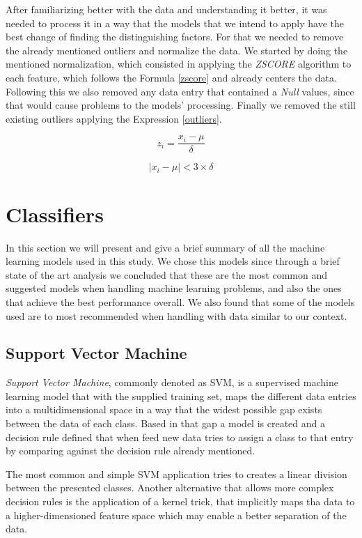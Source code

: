 \documentclass[conference]{IEEEtran}
\begin{document}
After familiarizing better with the data and understanding it better, it was needed to process it in a way that the models that we intend to apply have the best change of finding the distinguishing factors. For that we needed to remove the already mentioned outliers and normalize the data. We started by doing the mentioned normalization, which consisted in applying the \textit{ZSCORE} algorithm to each feature, which follows the Formula \ref{zscore} and already centers the data. Following this we also removed any data entry that contained a \textit{Null} values, since that would cause problems to the models' processing. Finally we removed the still existing outliers applying the Expression \ref{outliers}.

\begin{equation}\label{zscore}
    z_{i} = \frac{x_{i} - \mu}{\delta}
\end{equation}

\begin{equation}\label{outliers}
    |x_{i}-\mu| < 3\times\delta
\end{equation}

\section{Classifiers}\label{classifiers}
In this section we will present and give a brief summary of all the machine learning models used in this study. We chose this models since through a brief state of the art analysis we concluded that these are the most common and suggested models when handling machine learning problems, and also the ones that achieve the best performance overall. We also found that some of the models used are to most recommended when handling with data similar to our context.

\subsection{Support Vector Machine}
\textit{Support Vector Machine}, commonly denoted as SVM, is a supervised machine learning model that with the supplied training set, maps the different data entries into a multidimensional space in a way that the widest possible gap exists between the data of each class. Based in that gap a model is created and a decision rule defined that when feed new data tries to assign a class to that entry by comparing against the decision rule already mentioned.

The most common and simple SVM application tries to creates a linear division between the presented classes. Another alternative that allows more complex decision rules is the application of a kernel trick, that implicitly maps tha data to a higher-dimensioned feature space which may enable a better separation of the data.
\end{document}
